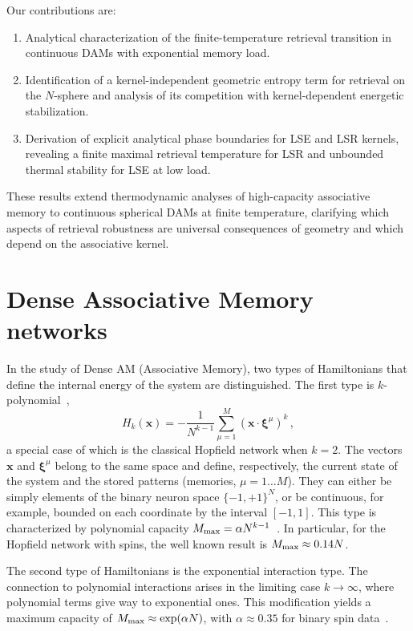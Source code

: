 \documentclass{article}
\theoremstyle{plain}
\theoremstyle{definition}
\theoremstyle{remark}
\begin{document}
Our contributions are:
\begin{enumerate}
    \item Analytical characterization of the finite-temperature retrieval transition in continuous DAMs with exponential memory load.
    \item Identification of a kernel-independent geometric entropy term for retrieval on the $N$-sphere and analysis of its competition with kernel-dependent energetic stabilization.
    \item Derivation of explicit analytical phase boundaries for LSE and LSR kernels, revealing a finite maximal retrieval temperature for LSR and unbounded thermal stability for LSE at low load.
\end{enumerate}

These results extend thermodynamic analyses of high-capacity associative memory to continuous spherical DAMs at finite temperature, clarifying which aspects of retrieval robustness are universal consequences of geometry and which depend on the associative kernel.






\section{Dense Associative Memory networks}

In the study of Dense AM (Associative Memory), two types of Hamiltonians that define the internal energy of the system are distinguished. The first type is $k$-polynomial~\cite{krotov2016dense}, 
\begin{equation}
    H_k(\bm{x}) = - \frac{1}{N^{k-1}} \sum\limits_{\mu=1}^{M} (\bm{x} \cdot \bm{\xi}^\mu)^k\,,
    \label{eq:H_k}
\end{equation}
a special case of which is the classical Hopfield network \cite{Hopfield1982} when $k=2$. 
The vectors $\bm{x}$ and $\bm{\xi}^\mu$ belong to the same space and define, respectively, the current state of the system and the stored patterns (memories, $\mu=1\dots M$). They can either be simply elements of the binary neuron space $\{-1,+1\}^N$, or be continuous, for example, bounded on each coordinate by the interval $[-1, 1]$. This type is characterized by polynomial capacity $M_{\rm max} = \alpha N^{k-1}$~\cite{krotov2016dense}. In particular, for the Hopfield network with spins, the well known result is $M_{\rm max} \approx 0.14N$.

The second type of Hamiltonians is the exponential interaction type. The connection to polynomial interactions arises in the limiting case $k \to \infty$, where polynomial terms give way to exponential ones. This modification yields a maximum capacity of $M_{\rm max} \approx \exp(\alpha N)$, with $\alpha \approx 0.35$ for binary spin data~\cite{demircigil2017model}.
\end{document}
